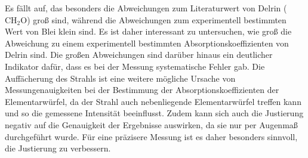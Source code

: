 \FloatBarrier
\noindent
Es fällt auf, das besonders die Abweichungen zum Literaturwert von Delrin ($\text{CH}_2\text{O}$) groß sind, 
während die Abweichungen zum experimentell bestimmten Wert von Blei klein sind. Es ist daher interessant zu untersuchen, wie 
groß die Abweichung zu einem experimentell bestimmten Absorptionskoeffizienten von Delrin sind. Die großen Abweichungen sind darüber hinaus
ein deutlicher Indikator dafür, dass es bei der Messung systematische Fehler gab. Die Auffächerung des Strahls ist eine weitere 
mögliche Ursache von Messungenauigkeiten bei der Bestimmung der Absorptionskoeffizienten der Elementarwürfel, da der Strahl auch nebenliegende
Elementarwürfel treffen kann und so die gemessene Intensität beeinflusst. Zudem kann sich auch die Justierung negativ auf die Genauigkeit
der Ergebnisse auswirken, da sie nur per Augenmaß durchgeführt wurde. Für eine präzisere Messung ist es daher besonders 
sinnvoll, die Justierung zu verbessern.